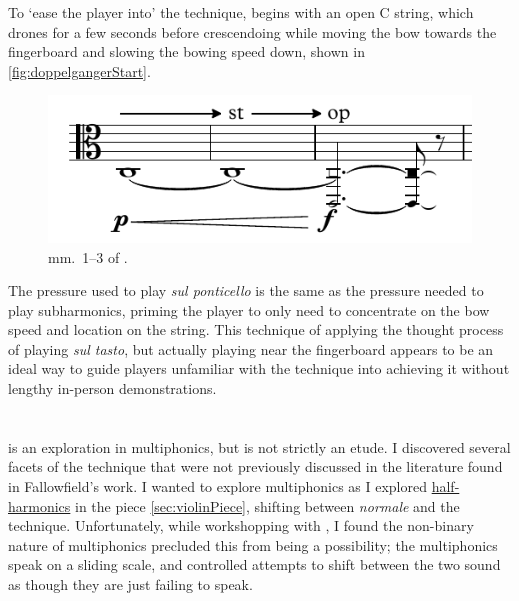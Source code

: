 To `ease the player into' the technique, \violaPiece\space begins with an open C string, which drones for a few seconds before crescendoing while moving the bow towards the fingerboard and slowing the bowing speed down, shown in \autoref{fig:doppelgangerStart}.
\begin{figure}
  \centering
  \includegraphics{./resources/doppelgangerStart.pdf}
  \caption{mm.\ 1--3 of \violaPiece.}\label{fig:doppelgangerStart}
\end{figure}
The pressure used to play \emph{sul ponticello} is the same as the pressure needed to play subharmonics, priming the player to only need to concentrate on the bow speed and location on the string.\autocite[]{appleseedFeedbackSightreadingSession2019}
This technique of applying the thought process of playing \emph{sul tasto}, but actually playing near the fingerboard appears to be an ideal way to guide players unfamiliar with the technique into achieving it without lengthy in-person demonstrations.\autocites[]{appleseedFeedbackSightreadingSession2019}{bloggsFeedbackContrabassSession2019}

\section{\celloPiece}\label{sec:celloPiece}

\hyperref[app:celloPiece Score]{\celloPiece} is an exploration in multiphonics, but is not strictly an etude.
I discovered several facets of the technique that were not previously discussed in the literature found in Fallowfield's work.\autocite[]{fallowfieldCelloMap}
I wanted to explore multiphonics as I explored \hyperref[sec:half-harmonics]{half-harmonics} in the piece \autoref{sec:violinPiece}, shifting between \emph{normale} and the technique.
Unfortunately, while workshopping with \celloParticipant, I found the non-binary nature of multiphonics precluded this from being a possibility; the multiphonics speak on a sliding scale, and controlled attempts to shift between the two sound as though they are just failing to speak.\autocite[]{smithFeedbackCelloSightreading2019}



